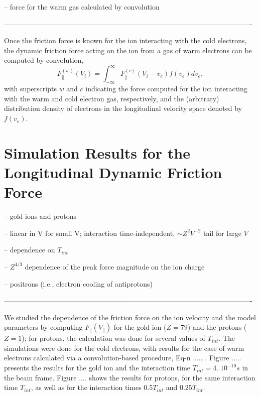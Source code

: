 \documentclass[12pt, reqno]{amsart}
\begin{document}
-- force for the warm gas calculated by convolution 

---------------------------------------------------------------------------------------------------------- 


Once the friction force is known for the ion interacting with the cold electrons, the dynamic friction force acting on the ion from a gas of warm electrons can be computed by convolution, 
\begin{equation}
F^{(w)}_{\parallel}(V_i) = \int_{-\infty}^{\infty}  F^{(c)}_{\parallel}(V_i -v_e) f(v_e) dv_e ,
\end{equation}
with superscripts $w$ and $c$ indicating the force computed for the ion interacting with the warm and cold electron gas, respectively, and the (arbitrary) distribution density of electrons in the longitudinal velocity space denoted by $f(v_e)$. 



\section{Simulation Results for the Longitudinal Dynamic Friction Force}

-- gold ions and protons 


-- linear in V for small V;  interaction time-independent,  $\sim Z^2 V^{-2} $ tail for large $V$ 

-- dependence on $T_{int}$ 

-- $Z^{4/3}$ dependence of the peak force magnitude on the ion charge  

-- positrons (i.e., electron cooling of antiprotons) 

---------------------------------------------------------------------------------------------------------- 

We studied the dependence of the friction force on the ion velocity and the model parameters by computing $F_{\parallel}(V_{\parallel})$ for the gold ion ($Z = 79$) and the protons ($Z = 1$); for protons, the calculation was done for several values of $T_{int}$.  The simulations were done for the cold electrons, with results for the case of warm electrons calculated via a convolution-based procedure, Eq-n ..... .  Figure ..... presents the results for the gold ion and the interaction time $T_{int} = 4. \; 10^{-10} s$ in the beam frame.  Figure .... shows the results for protons, for the same interaction time $T_{int}$, as well as for the interaction times $0.5T_{int}$ and $0.25T_{int}$. 
\end{document}
